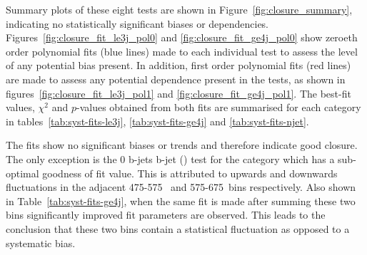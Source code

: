 Summary plots of these eight tests are shown in
Figure~\ref{fig:closure_summary}, indicating no statistically significant biases
or \HT dependencies. Figures~\ref{fig:closure_fit_le3j_pol0} and \ref{fig:closure_fit_ge4j_pol0} show
zeroeth order polynomial fits (blue lines) made to each individual test to assess the 
level of any potential bias present. In addition, first order polynomial fits 
(red lines) are made to assess any potential \HT dependence present in the
tests, as shown
in figures~\ref{fig:closure_fit_le3j_pol1} and \ref{fig:closure_fit_ge4j_pol1}.
The best-fit values, $\chi^2$ and $p$-values 
obtained from both fits are summarised for each \nj category in
tables~\ref{tab:syst-fits-le3j}, \ref{tab:syst-fits-ge4j} and
\ref{tab:syst-fits-njet}.

The fits show no significant biases or trends and therefore indicate good
closure. The only exception is the 0 b-jets  b-jet (\mj) test for the
\njhigh category which has a sub-optimal goodness of fit value. This is 
attributed to upwards and downwards fluctuations in the adjacent 475-575~\gev
and 575-675~\gev bins respectively. Also shown in Table~\ref{tab:syst-fits-ge4j},
when the same fit is made after summing these two bins significantly improved
fit parameters are observed. This leads to the conclusion that these two
bins contain a statistical fluctuation as opposed to a systematic bias.


